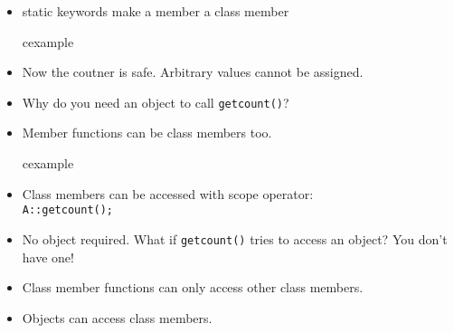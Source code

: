 \begin{frame}
\begin{itemize}
\item \alert{static} keywords make a member a class member
\begin{beamercolorbox}{cexample}
\codeclassmemtwo
\end{beamercolorbox}
\item Now the coutner is safe. Arbitrary values cannot be assigned.
\item Why do you need an object to call \lstinline!getcount()!?
\end{itemize}
\end{frame}

\begin{frame}
\begin{itemize}
\item Member functions can be class members too.
\begin{beamercolorbox}{cexample}
\codeclassmemthree
\end{beamercolorbox}
\item Class members can be accessed with scope operator:\\
	\lstinline!A::getcount();!
\item No object required. What if \lstinline!getcount()! tries to
	access an object? You don't have one!
\item Class member functions can only access other class members.
\item Objects can access class members.
\end{itemize}
\end{frame}



